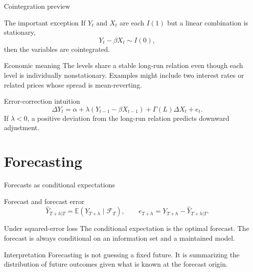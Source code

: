 \documentclass[10pt]{beamer}
\newcommand{\E}{\mathbb{E}}
\newcommand{\calF}{\mathcal{F}}
\begin{document}
\begin{frame}{Cointegration preview}
\small
\begin{block}{The important exception}
If $Y_t$ and $X_t$ are each $I(1)$ but a linear combination is stationary,
\[
Y_t-\beta X_t\sim I(0),
\]
then the variables are cointegrated.
\end{block}

\pause
\begin{exampleblock}{Economic meaning}
The levels share a stable long-run relation even though each level is individually nonstationary. Examples might include two interest rates or related prices whose spread is mean-reverting.
\end{exampleblock}

\pause
\begin{block}{Error-correction intuition}
\[
\Delta Y_t=\alpha+\lambda(Y_{t-1}-\beta X_{t-1})+\Gamma(L)\Delta X_t+e_t.
\]
If $\lambda<0$, a positive deviation from the long-run relation predicts downward adjustment.
\end{block}
\end{frame}

\section{Forecasting}

\begin{frame}{Forecasts as conditional expectations}
\small
\begin{block}{Forecast and forecast error}
\[
\widehat{Y}_{T+h|T}=\E(Y_{T+h}\mid\calF_T),
\qquad
e_{T+h}=Y_{T+h}-\widehat{Y}_{T+h|T}.
\]
\end{block}

\pause
\begin{exampleblock}{Under squared-error loss}
The conditional expectation is the optimal forecast. The forecast is always conditional on an information set and a maintained model.
\end{exampleblock}

\pause
\begin{alertblock}{Interpretation}
Forecasting is not guessing a fixed future. It is summarizing the distribution of future outcomes given what is known at the forecast origin.
\end{alertblock}
\end{frame}
\end{document}

